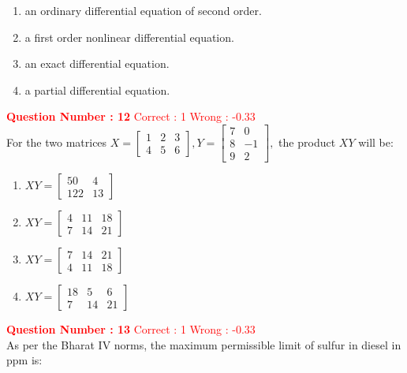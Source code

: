 \documentclass[12pt]{article}
\begin{document}
{\begin{enumerate}[label=(\Alph*)]
    \item an ordinary differential equation of second order.
    \item a first order nonlinear differential equation.
    \item an exact differential equation.
    \item a partial differential equation.
\end{enumerate}

\textbf{\textcolor{red}{Question Number : 12}} \hfill \textcolor{red}{Correct : 1  Wrong : -0.33} \\[1ex]
For the two matrices 
$ 
X = \begin{bmatrix} 1 & 2 & 3 \\ 4 & 5 & 6 \end{bmatrix}, 
Y = \begin{bmatrix} 7 & 0 \\ 8 & -1 \\ 9 & 2 \end{bmatrix},
$ 
the product $XY$ will be:

\begin{enumerate}[label=(\Alph*)]
    \item $XY = \begin{bmatrix} 50 & 4 \\ 122 & 13 \end{bmatrix}$
    \item $XY = \begin{bmatrix} 4 & 11 & 18 \\ 7 & 14 & 21 \end{bmatrix}$
    \item $XY = \begin{bmatrix} 7 & 14 & 21 \\ 4 & 11 & 18 \end{bmatrix}$
    \item $XY = \begin{bmatrix} 18 & 5 & 6 \\ 7 & 14 & 21 \end{bmatrix}$
\end{enumerate}

\vspace{2ex}


\textbf{\textcolor{red}{Question Number : 13}} \hfill \textcolor{red}{Correct : 1  Wrong : -0.33} \\[1ex]
As per the Bharat IV norms, the maximum permissible limit of sulfur in diesel in ppm is:

}
\end{document}

